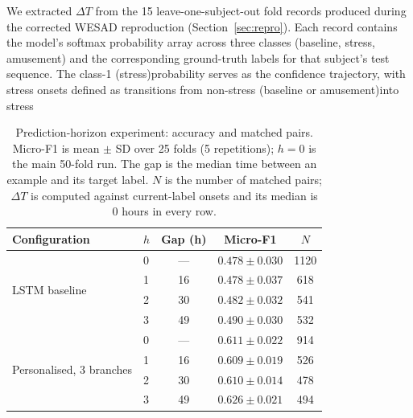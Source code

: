 \documentclass[preprint,12pt,authoryear]{elsarticle}
\newcommand{\dt}{$\Delta T$}
\providecommand{\DIFdeltex}[1]{{\protect\color{red} \scriptsize #1}} %
\providecommand{\DIFaddbegin}{} %
\providecommand{\DIFdelbegin}{} %
\providecommand{\DIFdelend}{} %
\providecommand{\DIFdel}[1]{\texorpdfstring{\DIFdeltex{#1}}{}} %
\newcommand{\DIFscaledelfig}{0.5}
\newlength{\DIFdelgraphicswidth} %
\newlength{\DIFdelgraphicsheight} %
\newcommand{\DIFaddincludegraphics}[2][]{{\color{blue}\fbox{\DIFOincludegraphics[#1]{#2}}}} %
\newcommand{\DIFdelincludegraphics}[2][]{%
\sbox{\DIFdelgraphicsbox}{\DIFOincludegraphics[#1]{#2}}%
\settoboxwidth{\DIFdelgraphicswidth}{\DIFdelgraphicsbox} %
\settoboxtotalheight{\DIFdelgraphicsheight}{\DIFdelgraphicsbox} %
\scalebox{\DIFscaledelfig}{%
\parbox[b]{\DIFdelgraphicswidth}{\usebox{\DIFdelgraphicsbox}\\[-\baselineskip] \rule{\DIFdelgraphicswidth}{0em}}\llap{\resizebox{\DIFdelgraphicswidth}{\DIFdelgraphicsheight}{%
\setlength{\unitlength}{\DIFdelgraphicswidth}%
\begin{picture}(1,1)%
\thicklines\linethickness{2pt} %
{\color[rgb]{1,0,0}\put(0,0){\framebox(1,1){}}}%
{\color[rgb]{1,0,0}\put(0,0){\line( 1,1){1}}}%
{\color[rgb]{1,0,0}\put(0,1){\line(1,-1){1}}}%
\end{picture}%
}\hspace*{3pt}}} %
} %
\DeclareRobustCommand{\DIFaddbegin}{\DIFOaddbegin \let\includegraphics\DIFaddincludegraphics} %
\DeclareRobustCommand{\DIFdelbegin}{\DIFOdelbegin \let\includegraphics\DIFdelincludegraphics} %
\DeclareRobustCommand{\DIFdelend}{\DIFOaddend \let\includegraphics\DIFOincludegraphics} %
\begin{document}
\DIFdelbegin \DIFdel{We extracted \dt{} from the 15 leave-one-subject-out fold records
produced during the corrected WESAD reproduction (Section~\ref{sec:repro}).
Each record contains the model's softmax probability array across three
classes (baseline, stress, amusement) and the corresponding ground-truth
labels for that subject's test sequence.
The class-1 (stress)probability
serves as the confidence trajectory, with stress onsets defined as
transitions from non-stress (baseline or amusement)into stress
}\DIFdelend \DIFaddbegin \begin{table}[h]
\centering
\caption{Prediction-horizon experiment: accuracy and matched pairs.
Micro-F1 is mean $\pm$ SD over 25 folds (5 repetitions); $h = 0$ is the
main 50-fold run. The gap is the median time between an example and its
target label. $N$ is the number of matched pairs; \dt{} is computed
against current-label onsets and its median is 0 hours in every row.}
\label{tab:horizon}
\begin{tabular}{llccc}
\toprule
Configuration & $h$ & Gap (h) & Micro-F1 & $N$ \\
\midrule
\multirow{4}{*}{LSTM baseline}
 & 0 & ---  & $0.478 \pm 0.030$ & 1120 \\
 & 1 & 16   & $0.478 \pm 0.037$ & 618  \\
 & 2 & 30   & $0.482 \pm 0.032$ & 541  \\
 & 3 & 49   & $0.490 \pm 0.030$ & 532  \\
\midrule
\multirow{4}{*}{Personalised, 3 branches}
 & 0 & ---  & $0.611 \pm 0.022$ & 914  \\
 & 1 & 16   & $0.609 \pm 0.019$ & 526  \\
 & 2 & 30   & $0.610 \pm 0.014$ & 478  \\
 & 3 & 49   & $0.626 \pm 0.021$ & 494  \\
\bottomrule
\end{tabular}
\end{table}
\end{document}
